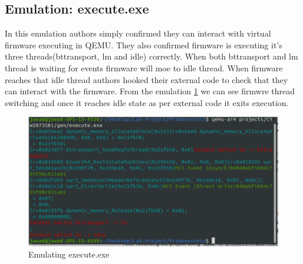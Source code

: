 \documentclass[letterpaper,11pt]{article}
\begin{document}
\subsection{Emulation: execute.exe}
In this emulation authors simply confirmed they can interact with virtual firmware executing in QEMU. They also confirmed firmware is executing it's three threads(bttransport, lm and idle) correctly. When both bttransport and lm thread is waiting for events firmware will moe to idle thread. When firmware reaches that idle thread authors hooked their external code to check that they can interact with the firmware. From the emulation \ref{fig:execute.exe} we can see firmwre thread switching and once it reaches idle state as per external code it exits execution.
\begin{figure}[!h]
    \centering
    \includegraphics[width=\textwidth]{images/execute.png}
    \caption{Emulating execute.exe}
    \label{fig:execute.exe}
\end{figure}
\end{document}
